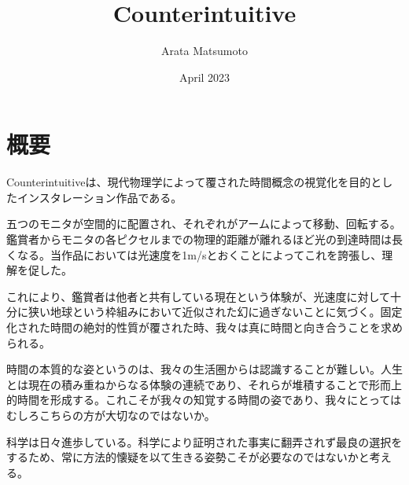 \documentclass[a4paper]{article}
\title{Counterintuitive}
\author{Arata Matsumoto}
\date{April 2023}
\begin{document}
\maketitle
\section{概要}
Counterintuitiveは、現代物理学によって覆された時間概念の視覚化を目的としたインスタレーション作品である。

五つのモニタが空間的に配置され、それぞれがアームによって移動、回転する。鑑賞者からモニタの各ピクセルまでの物理的距離が離れるほど光の到達時間は長くなる。当作品においては光速度を1m/sとおくことによってこれを誇張し、理解を促した。

これにより、鑑賞者は他者と共有している現在という体験が、光速度に対して十分に狭い地球という枠組みにおいて近似された幻に過ぎないことに気づく。固定化された時間の絶対的性質が覆された時、我々は真に時間と向き合うことを求められる。

時間の本質的な姿というのは、我々の生活圏からは認識することが難しい。人生とは現在の積み重ねからなる体験の連続であり、それらが堆積することで形而上的時間を形成する。これこそが我々の知覚する時間の姿であり、我々にとってはむしろこちらの方が大切なのではないか。

科学は日々進歩している。科学により証明された事実に翻弄されず最良の選択をするため、常に方法的懐疑を以て生きる姿勢こそが必要なのではないかと考える。
\end{document}
